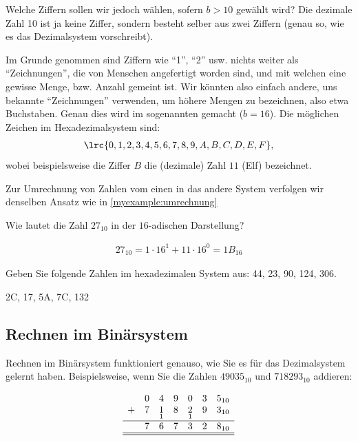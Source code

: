 Welche Ziffern sollen wir jedoch wählen, sofern $b>10$ gewählt wird? Die dezimale Zahl 10 ist ja keine Ziffer, sondern besteht selber aus zwei Ziffern (genau so, wie es das Dezimalsystem vorschreibt).

Im Grunde genommen sind Ziffern wie \enquote{1}, \enquote{2} usw. nichts weiter als \enquote{Zeichnungen}, die von Menschen angefertigt worden sind, und mit welchen eine gewisse Menge, bzw. Anzahl gemeint ist. Wir könnten also einfach andere, uns bekannte \enquote{Zeichnungen} verwenden, um höhere Mengen zu bezeichnen, also etwa Buchstaben. Genau dies wird im sogenannten  gemacht ($b=16$). Die möglichen Zeichen im Hexadezimalsystem sind:
\begin{align*}
	\lrc{0,1,2,3,4,5,6,7,8,9,A,B,C,D,E,F},
\end{align*}
wobei beispielsweise die Ziffer $B$ die (dezimale) Zahl $11$ (Elf) bezeichnet.

Zur Umrechnung von Zahlen vom einen in das andere System verfolgen wir denselben Ansatz wie in \cref{myexample:umrechnung}

\begin{myexercise}
	Wie lautet die Zahl $27_{10}$ in der $16$-adischen Darstellung?
	\begin{myanswer}
		\begin{align*}
			27_{10} = 1\cdot 16^1 + 11\cdot 16^0 = 1B_{16}
		\end{align*}
	\end{myanswer}
\end{myexercise}

\begin{myexercise}
	Geben Sie folgende Zahlen im hexadezimalen System aus: 44, 23, 90, 124, 306.
	\begin{myanswer}
		2C, 17, 5A, 7C, 132
	\end{myanswer}
\end{myexercise}


\subsection{Rechnen im Binärsystem}

Rechnen im Binärsystem funktioniert genauso, wie Sie es für das Dezimalsystem gelernt haben. Beispielsweise, wenn Sie die Zahlen $49035_{10}$ und $718293_{10}$ addieren:

\[
	\begin{array}{ccccccc}
		  & 0              & 4               & 9              & 0               & 3              & 5_{10}              \\
		+ & \underset{}{7} & \underset{1}{1} & \underset{}{8} & \underset{1}{2} & \underset{}{9} & \underset{}{3_{10}} \\
		\hline
		  & 7              & 6               & 7              & 3               & 2              & 8_{10}              \\\hline\hline
	\end{array}
\]

